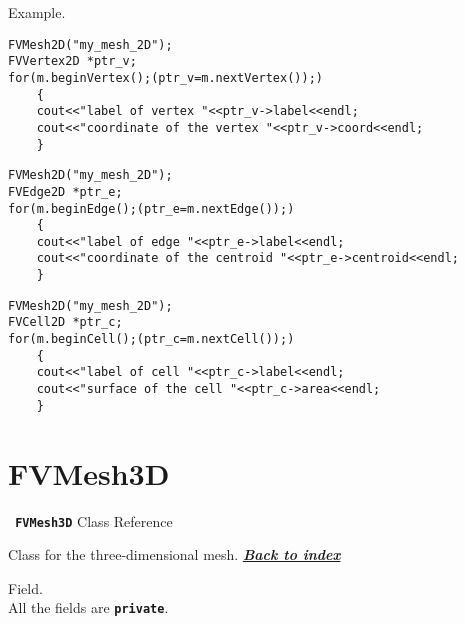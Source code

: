 \documentclass[12pt]{book}
\newcommand{\Index}[0]{{\bf \sl{\color{DodgerBlue} Back to index}}}
\newcommand{\Class}[1]{{\bf \tt{\color{magenta} #1}}}
\begin{document}
{\headline Example.}
\begin{lstlisting}[frame=TB,framerule=0.3pt,caption=Loop over the vertices of a 2D mesh]
FVMesh2D("my_mesh_2D");
FVVertex2D *ptr_v;
for(m.beginVertex();(ptr_v=m.nextVertex());)
    {
    cout<<"label of vertex "<<ptr_v->label<<endl;
    cout<<"coordinate of the vertex "<<ptr_v->coord<<endl;
    }
\end{lstlisting}
\begin{lstlisting}[frame=TB,framerule=0.3pt,caption=Loop over the edges of a 2D mesh]
FVMesh2D("my_mesh_2D");
FVEdge2D *ptr_e;
for(m.beginEdge();(ptr_e=m.nextEdge());)
    {
    cout<<"label of edge "<<ptr_e->label<<endl;
    cout<<"coordinate of the centroid "<<ptr_e->centroid<<endl;
    }
\end{lstlisting}
\begin{lstlisting}[frame=TB,framerule=0.3pt,caption=Loop over the cells of a 2D mesh]
FVMesh2D("my_mesh_2D");
FVCell2D *ptr_c;
for(m.beginCell();(ptr_c=m.nextCell());)
    {
    cout<<"label of cell "<<ptr_c->label<<endl;
    cout<<"surface of the cell "<<ptr_c->area<<endl;
    }
\end{lstlisting}
\newpage
%
%
\section{FVMesh3D}\label{FVMesh3D}
\centerline{\Class{\tt FVMesh3D} Class Reference}
\begin{Description*}
Class for the three-dimensional mesh.
\hfill \hyperref[MainIndex]{\Index}
\end{Description*}

{\headline Field.}\\[5pt]
All the fields are {\bf \tt private}.
\end{document}
